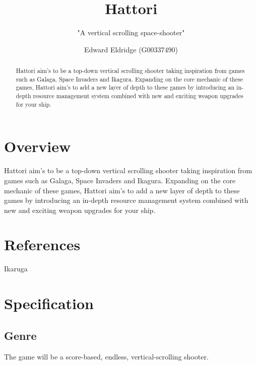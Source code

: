 \documentclass[a4paper]{scrreprt}
\title{Hattori}
\subtitle{"A vertical scrolling space-shooter"}
\author{Edward Eldridge (G00337490)}
\begin{document}
\maketitle

\begin{abstract}

  Hattori aim's to be a top-down vertical scrolling shooter taking inspiration from games such as Galaga, Space Invaders and Ikagura.
  Expanding on the core mechanic of these games, Hattori aim's to
  add a new layer of depth to these games by introducing an in-depth resource management system combined with new and exciting weapon upgrades for your ship. 

\end{abstract}

{
  \hypersetup{linkcolor=black}
  \tableofcontents
}

\chapter{Overview}

Hattori aim's to be a top-down vertical scrolling shooter taking inspiration from games such as Galaga, Space Invaders and Ikagura.
Expanding on the core mechanic of these games, Hattori aim's to
add a new layer of depth to these games by introducing an in-depth resource management system combined with new and exciting weapon upgrades for your ship. 


\chapter{References} 
Ikaruga


\chapter{Specification}

\section{Genre}
The game will be a score-based, endless, vertical-scrolling shooter.
\end{document}
